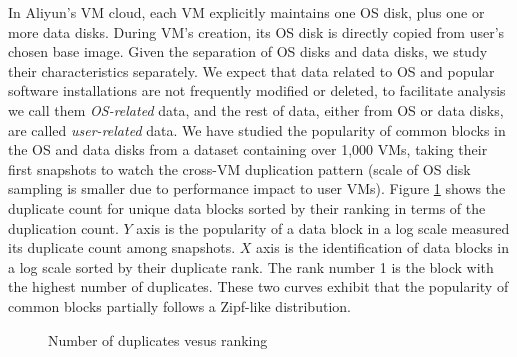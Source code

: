 In Aliyun's VM cloud, each VM explicitly maintains  one OS disk, plus one or more data disks.
During VM's creation, its OS disk is directly copied from user's chosen base image.
Given the separation of OS disks and data disks, we study  their characteristics separately.
We expect that data related to OS and popular software installations are not frequently
modified or deleted, to facilitate analysis we call them \emph{OS-related} data, 
and the rest of data, either from OS or data disks, are called \emph{user-related} data.
We have studied the popularity of common blocks in the OS and data disks from a dataset
containing over 1,000 VMs, taking their first snapshots to watch the cross-VM duplication pattern 
(scale of OS disk sampling is smaller due to performance impact to user VMs).
Figure \ref{fig:zipf-data} shows the duplicate count for unique data blocks sorted by their ranking in 
terms of the duplication count. $Y$ axis is the popularity of a data block in a log scale 
measured its duplicate count among snapshots. $X$ axis is the identification of data blocks in a log scale
sorted by their duplicate rank.  The rank number 1 is the block with the highest number of duplicates.
These two curves exhibit that the popularity of common blocks partially follows a Zipf-like distribution.


\begin{figure}[htbp]
\centering
{}


\caption{Number of duplicates vesus ranking}
\label{fig:zipf-data}
\end{figure}

